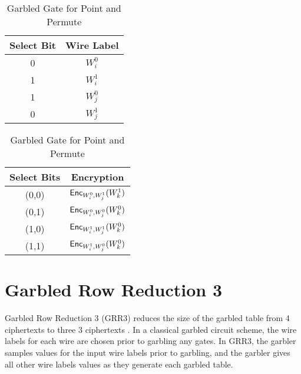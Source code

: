 
\begin{table}
    \label{tbl:point-and-permute}
    \centering
    \begin{tabular}{|c|c|}
        \hline
        Select Bit & Wire Label \\
        \hline
        0 & $W_i^0$ \\
        1 & $W_i^1$ \\
        1 & $W_j^0$ \\
        0 & $W_j^1$ \\
        \hline
    \end{tabular}
    \qquad
    \begin{tabular}{|c|c|}
        \hline
        Select Bits & Encryption \\
        \hline
        (0,0) & $\textsf{Enc}_{W_i^0, W_j^1}(W_k^1)$ \\
        (0,1) & $\textsf{Enc}_{W_i^0, W_j^0}(W_k^0)$ \\
        (1,0) & $\textsf{Enc}_{W_i^1, W_j^1}(W_k^0)$ \\
        (1,1) & $\textsf{Enc}_{W_i^1, W_j^0}(W_k^0)$ \\
        \hline
    \end{tabular}
    \caption{Garbled Gate for Point and Permute}
\end{table}

\section{Garbled Row Reduction 3}
Garbled Row Reduction 3 (GRR3) reduces the size of the garbled table from 4 ciphertexts to three 3 ciphertexts \cite{grr}.
In a classical garbled circuit scheme, the wire labels for each wire are chosen prior to garbling any gates.
In GRR3, the garbler samples values for the input wire labels prior to garbling, and the garbler gives all other wire labels values as they generate each garbled table.

